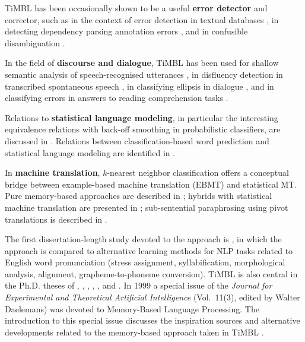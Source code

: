 \documentclass{book}
\begin{document}
TiMBL has been occasionally shown to be a useful {\bf error detector} and
corrector, such as in the context of error detection in textual
databases \cite{Sporleder+06}, in detecting dependency parsing
annotation errors \cite{Dickinson09}, and in confusible disambiguation
\cite{Stehouwer+09}.

In the field of {\bf discourse and dialogue}, TiMBL has been used for
shallow semantic analysis of speech-recognised utterances
\cite{Gustafson+99,Krahmer+01,VandenBosch+01,Lendvai+02a,Lendvai+03},
in disfluency detection in transcribed spontaneous speech
\cite{Lendvai+03c}, in classifying ellipsis in dialogue
\cite{Fernandez+04}, and in classifying errors in answers to reading
comprehension tasks \cite{Bailey+08}.

Relations to {\bf statistical language modeling}, in particular the
interesting equivalence relations with back-off smoothing in
probabilistic classifiers, are discussed in
\cite{Zavrel+97}. Relations between classification-based word
prediction and statistical language modeling are identified in
\cite{VandenBosch05,VandenBosch06,Stehouwer+09b}.

In {\bf machine translation}, $k$-nearest neighbor classification offers a
conceptual bridge between example-based machine translation (EBMT) and
statistical MT. Pure memory-based approaches are described in
\cite{VandenBosch+07,Canisius+09,VandenBosch+09,VanGompel+09}; hybrids
with statistical machine translation are presented in
\cite{Stroppa+07,Haque+09,Haque+10}; sub-sentential paraphrasing using pivot
translations is described in \cite{Max09}.

The first dissertation-length study devoted to the approach is
\cite{VandenBosch97}, in which the approach is compared to alternative
learning methods for NLP tasks related to English word pronunciation
(stress assignment, syllabification, morphological analysis,
alignment, grapheme-to-phoneme conversion). TiMBL is also central in
the Ph.D. theses of , ,
, , , and
. In 1999 a special issue of the {\em Journal for
  Experimental and Theoretical Artificial Intelligence} (Vol.~11(3),
edited by Walter Daelemans) was devoted to Memory-Based Language
Processing. The introduction to this special issue discusses the
inspiration sources and alternative developments related to the
memory-based approach taken in TiMBL \cite{Daelemans99b}.

\ \\
\end{document}
